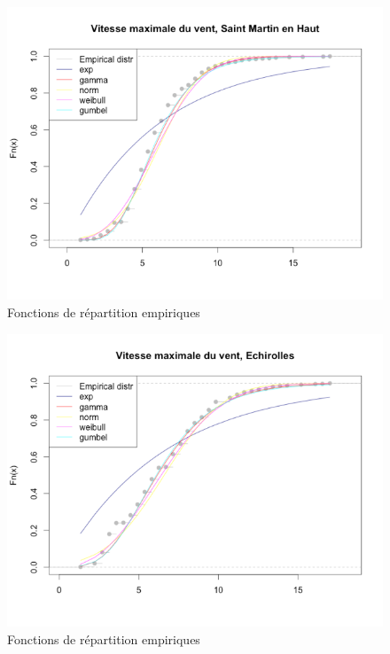 \noindent%
\begin{figure}[H]
    \begin{center}
      \includegraphics[width=12 cm, angle=0]{./pictures/Fdrx.png}
      \centering\caption{\label{2} Fonctions de répartition empiriques}
    \end{center}
\end{figure}

\noindent%
\begin{figure}[H]
    \begin{center}
      \includegraphics[width=12 cm, angle=0]{./pictures/Fdry.png}
      \centering\caption{\label{2} Fonctions de répartition empiriques}
    \end{center}
\end{figure}

